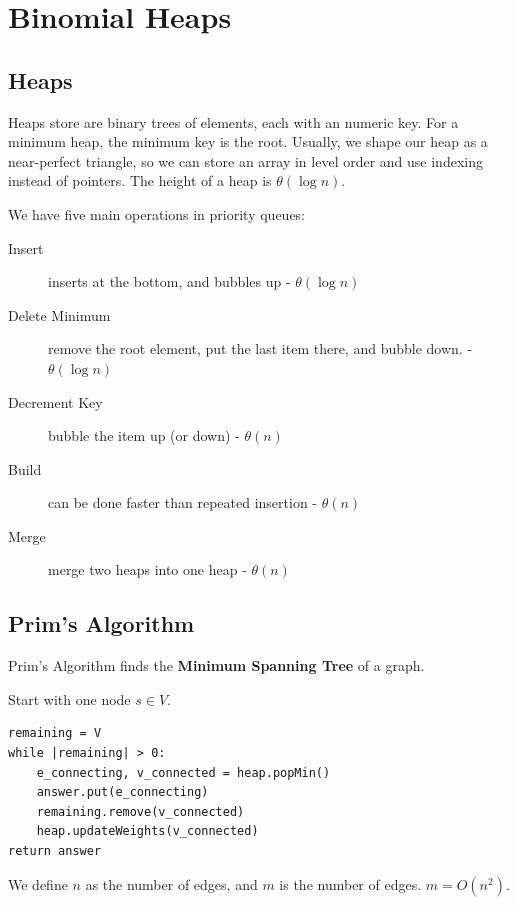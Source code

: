         \chapter{Binomial Heaps} %
        \label{cha:binomial_heaps}
            \section{Heaps} %
            \label{sec:heaps}
                Heaps store are binary trees of elements, each with an numeric key.
                For a minimum heap, the minimum key is the root.
                Usually, we shape our heap as a near-perfect triangle, so we can store an array in level order and use indexing instead of pointers.
                The height of a heap is $\theta(\log n)$.

                We have five main operations in priority queues:
                \begin{description}
                    \item[Insert] inserts at the bottom, and bubbles up - $\theta(\log n)$
                    \item[Delete Minimum] remove the root element, put the last item there, and bubble down. - $\theta(\log n)$
                    \item[Decrement Key] bubble the item up (or down) - $\theta(n)$
                    \item[Build] can be done faster than repeated insertion - $\theta(n)$
                    \item[Merge] merge two heaps into one heap - $\theta(n)$
                \end{description}
            \section{Prim's Algorithm} %
            \label{sec:prim_s_algorithm}
                Prim's Algorithm finds the \textbf{Minimum Spanning Tree} of a graph.

                Start with one node $s \in V$.
                \begin{lstlisting}
remaining = V
while |remaining| > 0:
    e_connecting, v_connected = heap.popMin()
    answer.put(e_connecting)
    remaining.remove(v_connected)
    heap.updateWeights(v_connected)
return answer
                \end{lstlisting}
                We define $n$ as the number of edges, and $m$ is the number of edges. $m = O(n^2)$.

